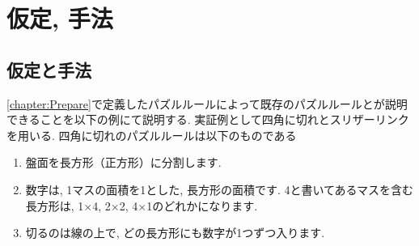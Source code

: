 \chapter{仮定, 手法}
\label{chapter:3}

\section{仮定と手法}

\cref{chapter:Prepare}で定義したパズルルールによって既存のパズルルールとが説明できることを以下の例にて説明する.
実証例として四角に切れとスリザーリンクを用いる. 四角に切れのパズルルールは以下のものである\cite{web:Sikakunikire}

\begin{enumerate}
  \item 盤面を長方形（正方形）に分割します.
  \item 数字は, 1マスの面積を1とした, 長方形の面積です. 4と書いてあるマスを含む長方形は,  1$\times$4, 2$\times$2, 4$\times$1のどれかになります.
  \item 切るのは線の上で, どの長方形にも数字が1つずつ入ります.
\end{enumerate}

\begin{example}

\end{example}
\begin{example}

\end{example}
